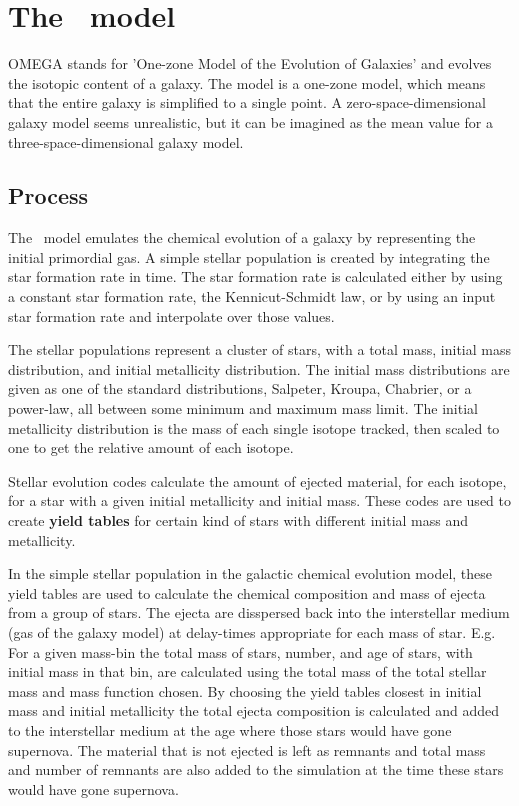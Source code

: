 \section{The \omegamodel\ model}
\label{sec:omega}
OMEGA stands for 'One-zone Model of the Evolution of Galaxies' and evolves the isotopic content of a galaxy.
The model is a one-zone model, which means that the entire galaxy is simplified to a single point.
A zero-space-dimensional galaxy model seems unrealistic, but it can be imagined as the mean value for a three-space-dimensional galaxy model.

\subsection{Process}
\label{sec:omega-process}
The \omegamodel\ model emulates the chemical evolution of a galaxy by representing the initial primordial gas. A simple stellar population is created by integrating the star formation rate in time.
The star formation rate is calculated either by using a constant star formation rate, the Kennicut-Schmidt law, or by using an input star formation rate and interpolate over those values.

The stellar populations represent a cluster of stars, with a total mass, initial mass distribution, and initial metallicity distribution.
The initial mass distributions are given as one of the standard distributions, Salpeter, Kroupa, Chabrier, or a power-law, all between some minimum and maximum mass limit.
The initial metallicity distribution is the mass of each single isotope tracked, then scaled to one to get the relative amount of each isotope.

Stellar evolution codes calculate the amount of ejected material, for each isotope, for a star with a given initial metallicity and initial mass. These codes are used to create \textbf{yield tables} for certain kind of stars with different initial mass and metallicity.

In the simple stellar population in the galactic chemical evolution model, these yield tables are used to calculate the chemical composition and mass of ejecta from a group of stars. The ejecta are disspersed back into the interstellar medium (gas of the galaxy model) at delay-times appropriate for each mass of star.
E.g. For a given mass-bin the total mass of stars, number, and age of stars, with initial mass in that bin, are calculated using the total mass of the total stellar mass and mass function chosen. By choosing the yield tables closest in initial mass and initial metallicity the total ejecta composition is calculated and added to the interstellar medium at the age where those stars would have gone supernova.
The material that is not ejected is left as remnants and total mass and number of remnants are also added to the simulation at the time these stars would have gone supernova.

